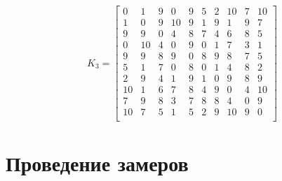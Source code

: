 \begin{equation}
	\label{eq:kd3}
K_{3} = \begin{bmatrix}
	0 & 1 & 9 & 0 & 9 & 5 & 2 & 10 & 7 & 10 \\
	1 & 0 & 9 & 10 & 9 & 1 & 9 & 1 & 9 & 7 \\
	9 & 9 & 0 & 4 & 8 & 7 & 4 & 6 & 8 & 5 \\
	0 & 10 & 4 & 0 & 9 & 0 & 1 & 7 & 3 & 1 \\
	9 & 9 & 8 & 9 & 0 & 8 & 9 & 8 & 7 & 5 \\
	5 & 1 & 7 & 0 & 8 & 0 & 1 & 4 & 8 & 2 \\
	2 & 9 & 4 & 1 & 9 & 1 & 0 & 9 & 8 & 9 \\
	10 & 1 & 6 & 7 & 8 & 4 & 9 & 0 & 4 & 10 \\
	7 & 9 & 8 & 3 & 7 & 8 & 8 & 4 & 0 & 9 \\
	10 & 7 & 5 & 1 & 5 & 2 & 9 & 10 & 9 & 0 \\
\end{bmatrix}
\end{equation}

\section{Проведение замеров}







